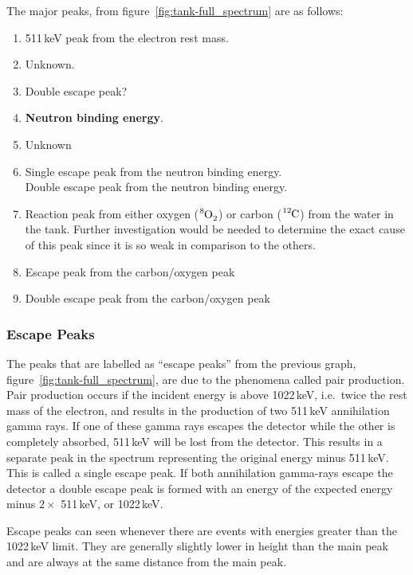 The major peaks, from figure~\ref{fig:tank-full_spectrum} are as follows:
	\begin{enumerate}\itemsep1pt \parskip0pt 
		\item 511\,keV peak from the electron rest mass.
		\item Unknown.
		\item Double escape peak?
		\item \textbf{Neutron binding energy}.
		\item Unknown
		\item Single escape peak from the neutron binding energy.\\
		Double escape peak from the neutron binding energy.
		\item Reaction peak from either oxygen ($\ce{^8O_2}$) or carbon ($\ce{^{12}C}$) from the water in the tank. Further investigation would be needed to determine the exact cause of this peak since it is so weak in comparison to the others.
		\item Escape peak from the carbon/oxygen peak
		\item Double escape peak from the carbon/oxygen peak
	\end{enumerate}

\subsubsection{Escape Peaks} %
\label{ssub:escape_peaks}
The peaks that are labelled as ``escape peaks'' from the previous graph, figure~\ref{fig:tank-full_spectrum}, are due to the phenomena called pair production. Pair production occurs if the incident energy is above 1022\,keV, i.e.\ twice the rest mass of the electron, and results in the production of two 511\,keV annihilation gamma rays. If one of these gamma rays escapes the detector while the other is completely absorbed, 511\,keV will be lost from the detector. This results in a separate peak in the spectrum representing the original energy minus 511\,keV. This is called a single escape peak. If both annihilation gamma-rays escape the detector a double escape peak is formed with an energy of the expected energy minus $2\times$ 511\,keV, or 1022\,keV\cite{baratta}.

Escape peaks can seen whenever there are events with energies greater than the 1022\,keV limit. They are generally slightly lower in height than the main peak and are always at the same distance from the main peak.

